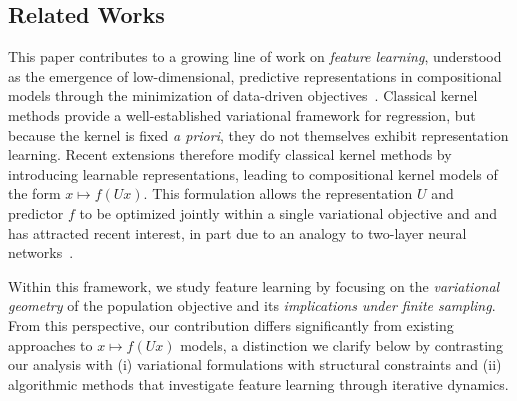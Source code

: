 \documentclass[sn-mathphys-num]{sn-jnl}%
\numberwithin{equation}{section}
\theoremstyle{thmstyleone}%
\theoremstyle{thmstyletwo}%
\theoremstyle{thmstylethree}%
\begin{document}
\subsection{Related Works}
\indent\indent
This paper contributes to a growing line of work on \emph{feature learning}, understood as the emergence of low-dimensional, predictive representations in compositional models through the minimization of data-driven objectives~\cite{BengioCoVi13}. Classical kernel methods provide a well-established variational framework for regression, but because the kernel is fixed \emph{a priori}, they do not themselves exhibit representation learning. Recent extensions therefore modify classical kernel methods by introducing learnable representations, leading to compositional kernel models of the form $x \mapsto f(Ux)$. This formulation allows the representation $U$ and predictor $f$ to be optimized jointly within a single variational objective and and has attracted recent interest, in part due to an analogy to two-layer neural networks~\cite{FukumizuBaJo09, Adit24A, FollainBa24, LiRu25, LiRub25}.


Within this framework, we study feature learning by focusing on the \emph{variational geometry} of the population objective and its \emph{implications under finite sampling}. From this perspective, our contribution differs significantly from existing approaches to $x \mapsto f(Ux)$ models, a distinction we clarify below by contrasting our analysis with (i) variational formulations with structural constraints and (ii) algorithmic methods that investigate feature learning  through iterative dynamics.
\end{document}
